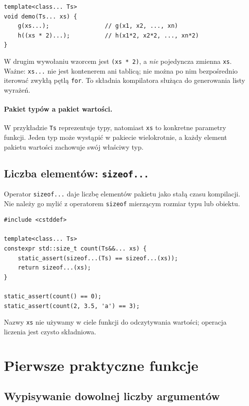 \begin{lstlisting}
template<class... Ts>
void demo(Ts... xs) {
    g(xs...);                // g(x1, x2, ..., xn)
    h((xs * 2)...);          // h(x1*2, x2*2, ..., xn*2)
}
\end{lstlisting}

W drugim wywołaniu wzorcem jest \texttt{(xs * 2)}, a \emph{nie}
pojedyncza zmienna \texttt{xs}. Ważne: \texttt{xs...} nie jest
kontenerem ani tablicą; nie można po nim bezpośrednio iterować zwykłą
pętlą \texttt{for}. To składnia kompilatora służąca do generowania
listy wyrażeń.

\paragraph{Pakiet typów a pakiet wartości.}
W przykładzie \texttt{Ts} reprezentuje typy, natomiast
\texttt{xs} to konkretne parametry funkcji. Jeden typ może wystąpić
w pakiecie wielokrotnie, a każdy element pakietu wartości zachowuje
swój właściwy typ.

\subsection{Liczba elementów: \texttt{sizeof...}}

Operator \texttt{sizeof...} daje liczbę elementów pakietu jako
stałą czasu kompilacji. Nie należy go mylić z operatorem
\texttt{sizeof} mierzącym rozmiar typu lub obiektu.

\begin{lstlisting}
#include <cstddef>

template<class... Ts>
constexpr std::size_t count(Ts&&... xs) {
    static_assert(sizeof...(Ts) == sizeof...(xs));
    return sizeof...(xs);
}

static_assert(count() == 0);
static_assert(count(2, 3.5, 'a') == 3);
\end{lstlisting}

Nazwy \texttt{xs} nie używamy w ciele funkcji do odczytywania
wartości; operacja liczenia jest czysto składniowa.

\section{Pierwsze praktyczne funkcje}

\subsection{Wypisywanie dowolnej liczby argumentów}

